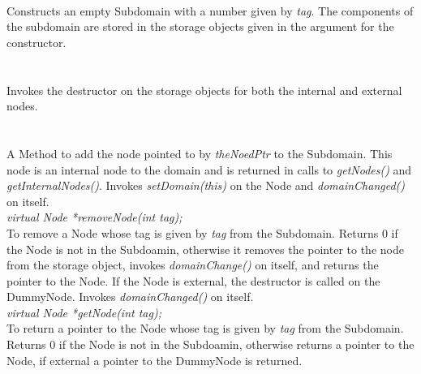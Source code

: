  \\
Constructs an empty Subdomain with a number given by {\em tag}. The
components of the subdomain are stored in the storage objects given in
the argument for the constructor. \\ 

  \\
  \\
Invokes the destructor on the storage objects for both the internal
and external nodes. \\ 


  \\
 \\
A Method to add the node pointed to by {\em theNoedPtr} to the
Subdomain. This node is an internal node to the domain and is
returned in calls to {\em getNodes()} and {\em getInternalNodes()}. 
Invokes {\em setDomain(this)} on the Node and {\em domainChanged()} on
itself.\\ 

{\em virtual Node *removeNode(int tag); } \\
To remove a Node whose tag is given by {\em tag} from the
Subdomain. Returns $0$ if the Node is not in the Subdoamin, otherwise
it removes the pointer to the node from the storage object, invokes
{\em domainChange()} on itself, and returns the pointer to the
Node. If the Node is external, the destructor is called on the
DummyNode. Invokes {\em domainChanged()} on itself. \\ 

{\em virtual Node *getNode(int tag); } \\
To return a pointer to the Node whose tag is given by {\em tag} from
the Subdomain. Returns $0$ if the Node is not in the Subdoamin,
otherwise returns a pointer to the Node, if external a pointer to the
DummyNode is returned. \\ 

